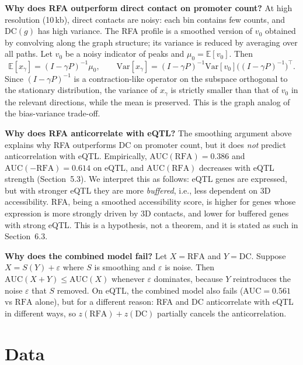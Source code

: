 \documentclass[11pt,a4paper]{article}
\begin{document}
\textbf{Why does RFA outperform direct contact on promoter count?} At high resolution (10\,kb), direct contacts are noisy: each bin contains few counts, and $\mathrm{DC}(g)$ has high variance. The RFA profile is a smoothed version of $v_0$ obtained by convolving along the graph structure; its variance is reduced by averaging over all paths. Let $v_0$ be a noisy indicator of peaks and $\mu_0 = \mathbb{E}[v_0]$. Then
\begin{equation}
\mathbb{E}[x_\gamma] = (I-\gamma P)^{-1} \mu_0, \qquad \mathrm{Var}[x_\gamma] = (I-\gamma P)^{-1} \mathrm{Var}[v_0] \big((I-\gamma P)^{-1}\big)^\top.
\end{equation}
Since $(I-\gamma P)^{-1}$ is a contraction-like operator on the subspace orthogonal to the stationary distribution, the variance of $x_\gamma$ is strictly smaller than that of $v_0$ in the relevant directions, while the mean is preserved. This is the graph analog of the bias-variance trade-off.

\textbf{Why does RFA anticorrelate with eQTL?} The smoothing argument above explains why RFA outperforms DC on promoter count, but it does \emph{not} predict anticorrelation with eQTL. Empirically, $\mathrm{AUC}(\mathrm{RFA}) = 0.386$ and $\mathrm{AUC}(-\mathrm{RFA}) = 0.614$ on eQTL, and $\mathrm{AUC}(\mathrm{RFA})$ decreases with eQTL strength (Section~5.3). We interpret this as follows: eQTL genes are expressed, but with stronger eQTL they are more \emph{buffered}, i.e., less dependent on 3D accessibility. RFA, being a smoothed accessibility score, is higher for genes whose expression is more strongly driven by 3D contacts, and lower for buffered genes with strong eQTL. This is a hypothesis, not a theorem, and it is stated as such in Section~6.3.

\textbf{Why does the combined model fail?} Let $X = \mathrm{RFA}$ and $Y = \mathrm{DC}$. Suppose $X = S(Y) + \varepsilon$ where $S$ is smoothing and $\varepsilon$ is noise. Then $\mathrm{AUC}(X+Y) \leq \mathrm{AUC}(X)$ whenever $\varepsilon$ dominates, because $Y$ reintroduces the noise $\varepsilon$ that $S$ removed. On eQTL, the combined model also fails ($\mathrm{AUC}=0.561$ vs $\mathrm{RFA}$ alone), but for a different reason: RFA and DC anticorrelate with eQTL in different ways, so $z(\mathrm{RFA}) + z(\mathrm{DC})$ partially cancels the anticorrelation.

\section{Data}
\end{document}
